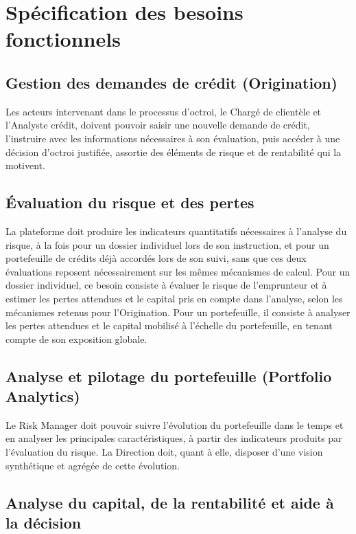 \section{Spécification des besoins fonctionnels}

\subsection{Gestion des demandes de crédit (Origination)}

Les acteurs intervenant dans le processus d'octroi, le Chargé de clientèle et l'Analyste crédit, doivent pouvoir saisir une nouvelle demande de crédit, l'instruire avec les informations nécessaires à son évaluation, puis accéder à une décision d'octroi justifiée, assortie des éléments de risque et de rentabilité qui la motivent.

\subsection{Évaluation du risque et des pertes}

La plateforme doit produire les indicateurs quantitatifs nécessaires à l'analyse du risque, à la fois pour un dossier individuel lors de son instruction, et pour un portefeuille de crédits déjà accordés lors de son suivi, sans que ces deux évaluations reposent nécessairement sur les mêmes mécanismes de calcul. Pour un dossier individuel, ce besoin consiste à évaluer le risque de l'emprunteur et à estimer les pertes attendues et le capital pris en compte dans l'analyse, selon les mécanismes retenus pour l'Origination. Pour un portefeuille, il consiste à analyser les pertes attendues et le capital mobilisé à l'échelle du portefeuille, en tenant compte de son exposition globale.

\subsection{Analyse et pilotage du portefeuille (Portfolio Analytics)}

Le Risk Manager doit pouvoir suivre l'évolution du portefeuille dans le temps et en analyser les principales caractéristiques, à partir des indicateurs produits par l'évaluation du risque. La Direction doit, quant à elle, disposer d'une vision synthétique et agrégée de cette évolution.

\subsection{Analyse du capital, de la rentabilité et aide à la décision}

